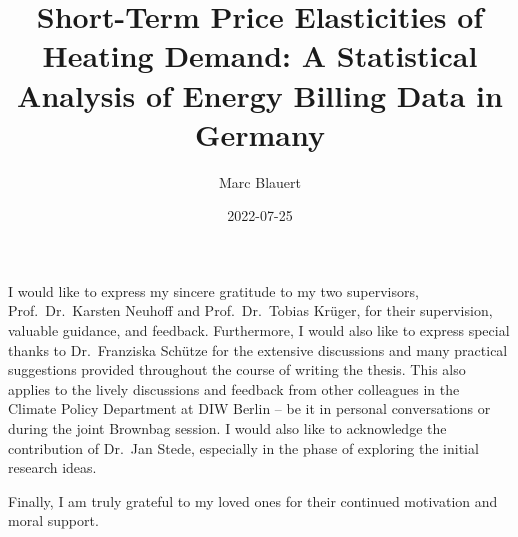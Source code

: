 \documentclass[12pt,twoside]{reedthesis}
\title{Short-Term Price Elasticities of Heating Demand: A Statistical Analysis of Energy Billing Data in Germany}
\author{Marc Blauert}
\date{2022-07-25}
\begin{document}
  \maketitle

\frontmatter %
\pagestyle{empty} %
  \begin{acknowledgements}
    I would like to express my sincere gratitude to my two supervisors, Prof.~Dr.~Karsten Neuhoff and Prof.~Dr.~Tobias Krüger, for their supervision, valuable guidance, and feedback. Furthermore, I would also like to express special thanks to Dr.~Franziska Schütze for the extensive discussions and many practical suggestions provided throughout the course of writing the thesis. This also applies to the lively discussions and feedback from other colleagues in the Climate Policy Department at DIW Berlin -- be it in personal conversations or during the joint Brownbag session. I would also like to acknowledge the contribution of Dr.~Jan Stede, especially in the phase of exploring the initial research ideas.

    \par

    Finally, I am truly grateful to my loved ones for their continued motivation and moral support.

    \par
  \end{acknowledgements}

  \hypersetup{linkcolor=black}
  \setcounter{secnumdepth}{2}
  \setcounter{tocdepth}{2}
  \tableofcontents

  \listoftables
\end{document}
